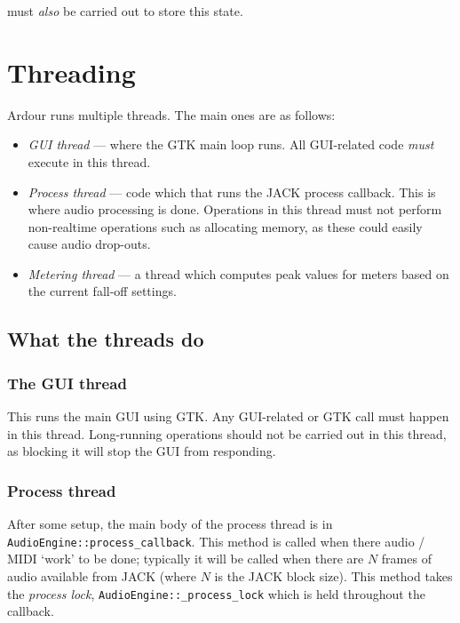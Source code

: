 \documentclass[10pt,a4paper]{book}
\newcommand{\code}[1]{\texttt{#1}}
\begin{document}
must \emph{also} be carried out to store this state.



\chapter{Threading}

Ardour runs multiple threads.  The main ones are as follows:

\begin{itemize}
\item \textit{GUI thread} --- where the GTK main loop runs.  All
  GUI-related code \textit{must} execute in this thread.
\item \textit{Process thread} --- code which that runs the JACK
  process callback.  This is where audio processing is done.
  Operations in this thread must not perform non-realtime operations
  such as allocating memory, as these could easily cause audio
  drop-outs.
\item \textit{Metering thread} --- a thread which computes peak values
  for meters based on the current fall-off settings.
\end{itemize}


\section{What the threads do}

\subsection{The GUI thread}

This runs the main GUI using GTK\@.  Any GUI-related or GTK call must
happen in this thread.  Long-running operations should not be carried
out in this thread, as blocking it will stop the GUI from responding.

\subsection{Process thread}

After some setup, the main body of the process thread is in
\code{AudioEngine::process\_callback}.  This method is called when
there audio / MIDI `work' to be done; typically it will be called when
there are $N$ frames of audio available from JACK (where $N$ is the
JACK block size).  This method takes the \textit{process lock},
\code{AudioEngine::\_process\_lock} which is held throughout the
callback.
\end{document}
